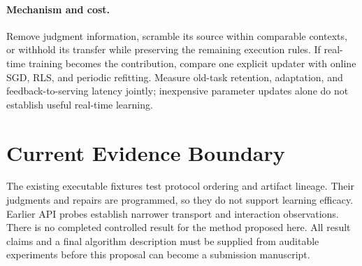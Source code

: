 \documentclass[sigconf,anonymous]{aamas}
\begin{document}
\paragraph{Mechanism and cost.}
Remove judgment information, scramble its source within comparable contexts,
or withhold its transfer while preserving the remaining execution rules. If
real-time training becomes the contribution, compare one explicit updater with
online SGD, RLS, and periodic refitting. Measure old-task retention, adaptation,
and feedback-to-serving latency jointly; inexpensive parameter updates alone
do not establish useful real-time learning.

\section{Current Evidence Boundary}

The existing executable fixtures test protocol ordering and artifact lineage.
Their judgments and repairs are programmed, so they do not support learning
efficacy. Earlier API probes establish narrower transport and interaction
observations. There is no completed controlled result for the method proposed
here. All result claims and a final algorithm description must be supplied from
auditable experiments before this proposal can become a submission manuscript.
\end{document}

